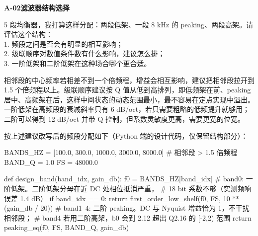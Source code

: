 \documentclass[withoutpreface,bwprint]{cumcmthesis}
\newcommand{\aichat}[2]{%
  \par\vspace{1.0em}%
  \noindent\textbf{\zihao{-4}#1\quad #2}\par
  \vspace{0.6em}%
}
\begin{document}

\aichat{A-02}{滤波器结构选择}

\begin{tcolorbox}[title=\textbf{用户提示词}, colback=blue!2!white,
                  colframe=blue!30!black, fonttitle=\bfseries, breakable]
5 段均衡器，我打算这样分配：两段低架、一段 8 kHz 的 peaking、两段高架。请评估这个结构：\\
1. 频段之间是否会有明显的相互影响；\\
2. 级联顺序对数值条件数有什么影响，建议怎么排；\\
3. 一阶低架和二阶低架在这种场合哪个更合适。
\end{tcolorbox}

\begin{tcolorbox}[title=\textbf{AI 回答要点}, colback=green!2!white,
                  colframe=green!30!black, fonttitle=\bfseries, breakable]
相邻段的中心频率若相差不到一个倍频程，增益会相互影响，建议把相邻段拉开到 1.5 个倍频程以上。级联顺序建议按 Q 值从低到高排列，即低频架在前、peaking 居中、高频架在后，这样中间状态的动态范围最小，最不容易在定点实现中溢出。一阶低架在高频段的衰减斜率只有 6 dB/oct，若只需要粗略的低频提升就够用；二阶可以得到 12 dB/oct 并带 Q 控制，但系数灵敏度更高，需要更宽的位宽。

按上述建议改写后的频段分配如下（Python 端的设计代码，仅保留结构部分）：

\begin{ai_python}
BANDS_HZ = [100.0, 300.0, 1000.0, 3000.0, 8000.0]   # 相邻段 > 1.5 倍频程
BAND_Q   = 1.0
FS       = 48000.0

def design_band(band_idx, gain_db):
    f0 = BANDS_HZ[band_idx]
    # band0: 一阶低架。二阶低架分母在近 DC 处相位抵消严重，
    #        18 bit 系数不够（实测频响误差 1.4 dB）
    if band_idx == 0:
        return first_order_low_shelf(f0, FS, 10 ** (gain_db / 20))
    # band1~4: 二阶 peaking。DC 与 Nyquist 增益恰为 1，不干扰相邻段；
    #          band4 若用二阶高架，b0 会到 2.12 超出 Q2.16 的 [-2,2) 范围
    return peaking_eq(f0, FS, BAND_Q, gain_db)
\end{ai_python}
\end{tcolorbox}

%
\end{document}

